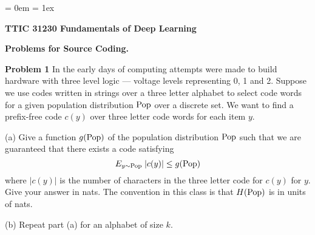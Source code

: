 

\parindent = 0em
\parskip = 1ex

\newcommand{\solution}[1]{\bigskip {\color{red} {\bf Solution}: #1}}




\centerline{\bf TTIC 31230 Fundamentals of Deep Learning}

\bigskip

\centerline{\bf Problems for Source Coding.}

\bigskip
\bigskip

{\bf Problem 1}
In the early days of computing attempts were made to build hardware with three level logic --- voltage levels representing
0, 1 and 2.  Suppose we use codes written in strings over a three letter alphabet to select code words for a given population
distribution $\mathrm{Pop}$ over a discrete set.  We want to find a prefix-free code $c(y)$ over three letter code words
for each item $y$.

\medskip
(a) Give a function $g(\mathrm{Pop})$ of the population distribution $\mathrm{Pop}$ such that we are guaranteed
that there exists a code satisfying
$$E_{y \sim \mathrm{Pop}}\;|c(y)| \leq g(\mathrm{Pop})$$
where $|c(y)|$ is the number of characters in the three letter code for $c(y)$ for $y$.
Give your answer in nats.  The convention in this class is that $H(\mathrm{Pop})$ is in units of nats.


\solution{
  $$E_{y \sim \pop}\;|y| \leq \frac{H(\pop)}{\ln 3} + 1$$
}

\medskip
(b) Repeat part (a) for an alphabet of size $k$.

\solution{
  $$E_{y \sim \pop}\;|y| \leq \frac{H(\pop)}{\ln k} + 1$$
}


